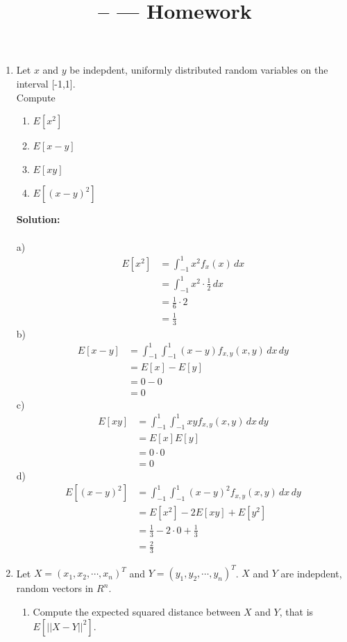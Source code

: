 \documentclass[11pt]{article}
\title{\CRS -- \Session --- Homework \Homework} %
\author{\Name}
\date{}
\begin{document}
\maketitle

\begin{enumerate}
	\item Let $x$ and $y$ be indepdent, uniformly distributed random variables on the interval [-1,1]. \\
	Compute 
	\begin{enumerate}
		\item $E[x^2]$
		\item $E[x-y]$
		\item $E[xy]$
		\item $E[(x-y)^2]$
	\end{enumerate}
	\textbf{Solution:} \\ \\
	a) \begin{align*}
		E[x^2] &= \int_{-1}^{1}x^2f_x(x)\,dx \\
		&= \int_{-1}^{1}x^2 \cdot \frac{1}{2}\,dx \\
		&= \frac{1}{6} \cdot 2 \\
		&= \frac{1}{3}
	\end{align*}
	b) \begin{align*}
		E[x-y] &= \int_{-1}^{1}\int_{-1}^{1}(x-y)f_{x,y}(x,y)\,dx\,dy \\
		&= E[x] - E[y] \\
		&= 0 - 0 \\
		&= 0
	\end{align*}
	c) \begin{align*}
		E[xy] &= \int_{-1}^{1}\int_{-1}^{1}xyf_{x,y}(x,y)\,dx\,dy \\
		&= E[x]E[y] \\
		&= 0\cdot0 \\
		&= 0
	\end{align*}
	d) \begin{align*}
		E[(x-y)^2] &= \int_{-1}^{1}\int_{-1}^{1}(x-y)^2f_{x,y}(x,y)\,dx\,dy \\
		&= E[x^2] -2E[xy] + E[y^2] \\
		&= \frac{1}{3} - 2\cdot0 + \frac{1}{3} \\
		&= \frac{2}{3}
	\end{align*}
	\item Let $X = (x_1, x_2, \cdots, x_n)^{T}$ and $Y = (y_1, y_2, \cdots, y_n)^{T}$. $X$ and $Y$ are indepdent, random vectors in $R^n$. 
	\begin{enumerate}
		\item Compute the expected squared distance between $X$ and $Y$, that is $E[||X-Y||^2]$. \\

\end{enumerate}
\end{enumerate}
\end{document}
